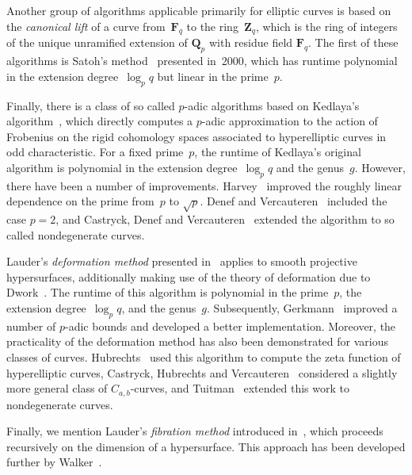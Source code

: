 Another group of algorithms applicable primarily for elliptic curves 
is based on the \emph{canonical lift} of a curve from~$\mathbf{F}_{q}$ 
to the ring~$\mathbf{Z}_{q}$, which is the ring of integers of the 
unique unramified extension of $\mathbf{Q}_{p}$ with residue field 
$\mathbf{F}_{q}$.  The first of these algorithms is Satoh's 
method~\citep{Satoh2000} presented in~2000, which has runtime 
polynomial in the extension degree~$\log_{p} q$ but linear in the prime~$p$.

Finally, there is a class of so called $p$-adic algorithms based on 
Kedlaya's algorithm~\citep{Kedlaya2001}, which directly computes a 
$p$-adic approximation to the action of Frobenius on the rigid cohomology 
spaces associated to hyperelliptic curves in odd characteristic.  
For a fixed prime~$p$, the runtime of Kedlaya's original algorithm 
is polynomial in the extension degree~$\log_{p} q$ and the genus~$g$.  
However, there have been a number of improvements.  Harvey~\citep{Harvey2007} 
improved the roughly linear dependence on the prime from~$p$ to $\sqrt{p}$.  
Denef and Vercauteren~\citep{DenVer2006} included the case $p = 2$, and 
Castryck, Denef and Vercauteren~\citep{CasDenVer2006} extended the algorithm 
to so called nondegenerate curves.

Lauder's \emph{deformation method} presented in~\citep{Lau04a} 
applies to smooth projective hypersurfaces, additionally making use 
of the theory of deformation due to Dwork~\citep{Dwork62b}.  The 
runtime of this algorithm is polynomial in the prime~$p$, the 
extension degree~$\log_{p} q$, and the genus~$g$.  Subsequently, 
Gerkmann~\citep{Gerkmann2007} improved a number of $p$-adic bounds 
and developed a better implementation.  Moreover, the practicality 
of the deformation method has also been demonstrated for various 
classes of curves.  Hubrechts~\citep{Hubrechts2007, Hubrechts2008} 
used this algorithm to compute the zeta function of hyperelliptic curves, 
Castryck, Hubrechts and Vercauteren~\citep{CasHubVer2008} considered 
a slightly more general class of $C_{a,b}$-curves, and 
Tuitman~\citep{Tuitman2011} extended this work to nondegenerate curves. 

Finally, we mention Lauder's \emph{fibration method} introduced 
in~\citep{Lauder2006}, which proceeds recursively on the dimension 
of a hypersurface.  This approach has been developed further 
by Walker~\citep{Walker2009}.


